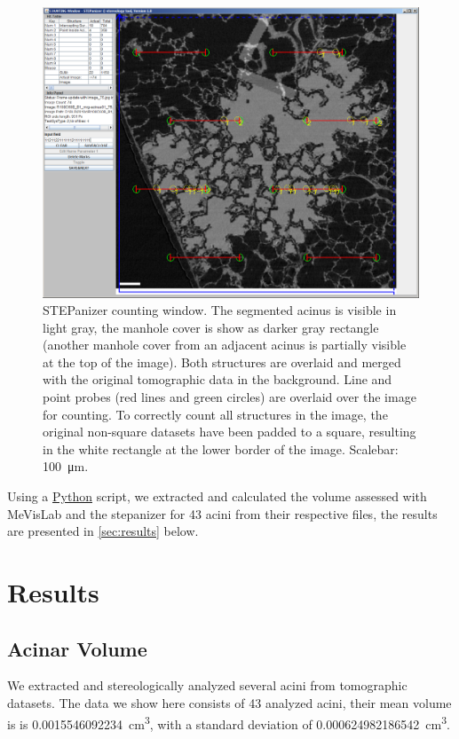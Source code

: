 \documentclass[%
	twoside,
	paper=a4,%
	abstract=true,%
	]{scrartcl}
\newcommand{\imsize}{\linewidth}
\newcommand{\numberofacini}{43}
\newcommand{\volume}{0.0015546092234} %
\newcommand{\std}{0.000624982186542} %
\begin{document}
\renewcommand{\imsize}{\linewidth}%
\begin{figure}
	\centering
	\includegraphics[width=\imsize]{img/STEPanizer_2010_R108C60B_acinus01_Slice75}
	\caption{STEPanizer counting window. The segmented acinus is visible in light gray, the manhole cover is show as darker gray rectangle (another manhole cover from an adjacent acinus is partially visible at the top of the image). Both structures are overlaid and merged with the original tomographic data in the background. Line and point probes (red lines and green circles) are overlaid over the image for counting. To correctly count all structures in the image, the original non-square datasets have been padded to a square, resulting in the white rectangle at the lower border of the image. Scalebar: \SI{100}{\micro\meter}.}
	\label{fig:STEPanizer}
\end{figure}

Using a \href{http://python.org/}{Python} script, we extracted and calculated the volume assessed with MeVisLab and the stepanizer for 43 acini from their respective files, the results are presented in \autoref{sec:results} below.

\section{Results}
\label{sec:results}
\subsection{Acinar Volume}
We extracted and stereologically analyzed several acini from tomographic datasets. The data we show here consists of \numberofacini\xspace analyzed acini, their mean volume is is \SI{\volume}{\centi\metre\cubed}, with a standard deviation of \SI{\std}{\centi\metre\cubed}.
\end{document}

